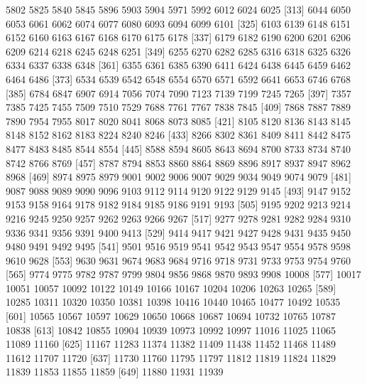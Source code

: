 \documentclass[a4paper]{article}
\begin{document}
\begin{Schunk}
\begin{Soutput}
[301]  5802  5825  5840  5845  5896  5903  5904  5971  5992  6012  6024  6025
[313]  6044  6050  6053  6061  6062  6074  6077  6080  6093  6094  6099  6101
[325]  6103  6139  6148  6151  6152  6160  6163  6167  6168  6170  6175  6178
[337]  6179  6182  6190  6200  6201  6206  6209  6214  6218  6245  6248  6251
[349]  6255  6270  6282  6285  6316  6318  6325  6326  6334  6337  6338  6348
[361]  6355  6361  6385  6390  6411  6424  6438  6445  6459  6462  6464  6486
[373]  6534  6539  6542  6548  6554  6570  6571  6592  6641  6653  6746  6768
[385]  6784  6847  6907  6914  7056  7074  7090  7123  7139  7199  7245  7265
[397]  7357  7385  7425  7455  7509  7510  7529  7688  7761  7767  7838  7845
[409]  7868  7887  7889  7890  7954  7955  8017  8020  8041  8068  8073  8085
[421]  8105  8120  8136  8143  8145  8148  8152  8162  8183  8224  8240  8246
[433]  8266  8302  8361  8409  8411  8442  8475  8477  8483  8485  8544  8554
[445]  8588  8594  8605  8643  8694  8700  8733  8734  8740  8742  8766  8769
[457]  8787  8794  8853  8860  8864  8869  8896  8917  8937  8947  8962  8968
[469]  8974  8975  8979  9001  9002  9006  9007  9029  9034  9049  9074  9079
[481]  9087  9088  9089  9090  9096  9103  9112  9114  9120  9122  9129  9145
[493]  9147  9152  9153  9158  9164  9178  9182  9184  9185  9186  9191  9193
[505]  9195  9202  9213  9214  9216  9245  9250  9257  9262  9263  9266  9267
[517]  9277  9278  9281  9282  9284  9310  9336  9341  9356  9391  9400  9413
[529]  9414  9417  9421  9427  9428  9431  9435  9450  9480  9491  9492  9495
[541]  9501  9516  9519  9541  9542  9543  9547  9554  9578  9598  9610  9628
[553]  9630  9631  9674  9683  9684  9716  9718  9731  9733  9753  9754  9760
[565]  9774  9775  9782  9787  9799  9804  9856  9868  9870  9893  9908 10008
[577] 10017 10051 10057 10092 10122 10149 10166 10167 10204 10206 10263 10265
[589] 10285 10311 10320 10350 10381 10398 10416 10440 10465 10477 10492 10535
[601] 10565 10567 10597 10629 10650 10668 10687 10694 10732 10765 10787 10838
[613] 10842 10855 10904 10939 10973 10992 10997 11016 11025 11065 11089 11160
[625] 11167 11283 11374 11382 11409 11438 11452 11468 11489 11612 11707 11720
[637] 11730 11760 11795 11797 11812 11819 11824 11829 11839 11853 11855 11859
[649] 11880 11931 11939
\end{Soutput}
\end{Schunk}
\end{document}
